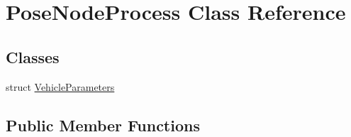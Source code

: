 \hypertarget{classPoseNodeProcess}{}\section{Pose\+Node\+Process Class Reference}
\label{classPoseNodeProcess}
\subsection*{Classes}
\begin{DoxyCompactItemize}
\item 
struct \hyperlink{structPoseNodeProcess_1_1VehicleParameters}{Vehicle\+Parameters}
\end{DoxyCompactItemize}
\subsection*{Public Member Functions}
